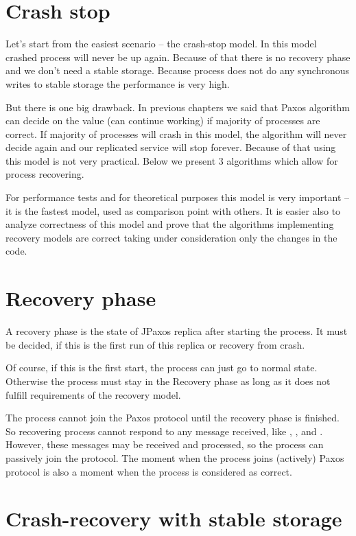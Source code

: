 \section{Crash stop}
\label{sec:crash_stop}

Let's start from the easiest scenario -- the crash-stop model. In this model crashed process will never be up again.
Because of that there is no recovery phase and we don't need a stable storage. Because process does not do any synchronous writes to stable storage the performance is very high. 

But there is one big drawback. In previous chapters we said that Paxos algorithm can decide on the value (can continue working) if majority of processes are correct. If majority of processes will crash in this model, the algorithm will never decide again and our replicated service will stop forever. Because of that using this model is not very practical. Below we present 3 algorithms which allow for process recovering.

For performance tests and for theoretical purposes this model is very important -- it is the fastest model, used as comparison point with others. It is easier also to analyze correctness of this model and prove that the algorithms implementing recovery models are correct taking under consideration only the changes in the code.

\section{Recovery phase}

A recovery phase is the state of JPaxos replica after starting the process. It must be decided, if this is the first run of this replica or recovery from crash.

Of course, if this is the first start, the process can just go to normal state. Otherwise the process must stay in the Recovery phase as long as it does not fulfill requirements of the recovery model.

The process cannot join the Paxos protocol until the recovery phase is finished. So recovering process cannot respond to any message received, like \propose[], \accept[], \prepare and \prepareOK[]. However, these messages may be received and processed, so the process can passively join the protocol. The moment when the process joins (actively) Paxos protocol is also a moment when the process is considered as correct.


\section{Crash-recovery with stable storage}
\label{sec:full_ss}

